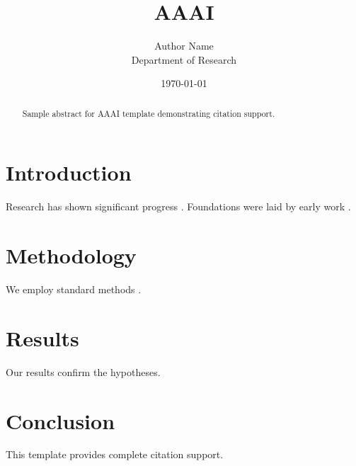 \documentclass{article}
\title{AAAI}
\author{Author Name \\ \small Department of Research}
\date{\today}
\begin{document}
\maketitle

\begin{abstract}
Sample abstract for AAAI template demonstrating citation support.
\end{abstract}

\section{Introduction}
Research has shown significant progress \citep{einstein1905}. Foundations were laid by early work \citep{turing1950}.

\section{Methodology}
We employ standard methods \citep{knuth1984}.

\section{Results}
Our results confirm the hypotheses.

\section{Conclusion}
This template provides complete citation support.



\end{document}
